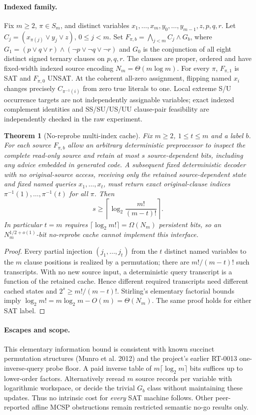 \documentclass[11pt]{article}
\newtheorem{theorem}{Theorem}
\begin{document}
\paragraph{Indexed family.} Fix $m\ge2$, $\pi\in S_m$, and distinct variables $x_1,\ldots,x_m,y_0,\ldots,y_{m-1},z,p,q,r$. Let $C_j=(x_{\pi(j)}\vee y_j\vee z)$, $0\le j<m$. Set $F_{\pi,b}=\bigwedge_{j<m} C_j\land G_b$, where $G_1=(p\vee q\vee r)\land(\neg p\vee\neg q\vee\neg r)$ and $G_0$ is the conjunction of all eight distinct signed ternary clauses on $p,q,r$. The clauses are proper, ordered and have fixed-width indexed source encoding $N_m=\Theta(m\log m)$. For every $\pi$, $F_{\pi,1}$ is SAT and $F_{\pi,0}$ UNSAT. At the coherent all-zero assignment, flipping named $x_i$ changes precisely $C_{\pi^{-1}(i)}$ from zero true literals to one. Local extreme S/U occurrence targets are not independently assignable variables; exact indexed complement identities and SS/SU/US/UU clause-pair feasibility are independently checked in the raw experiment.
\begin{theorem}[No-reprobe multi-index cache]
Fix $m\ge2$, $1\le t\le m$ and a label $b$. For each source $F_{\pi,b}$ allow an arbitrary deterministic preprocessor to inspect the complete read-only source and retain at most $s$ source-dependent bits, including any advice embedded in generated code. A subsequent fixed deterministic decoder with no original-source access, receiving only the retained source-dependent state and fixed named queries $x_1,\ldots,x_t$, must return exact original-clause indices $\pi^{-1}(1),\ldots,\pi^{-1}(t)$ for all $\pi$. Then
\[
\boxed{s\ge\left\lceil\log_2\frac{m!}{(m-t)!}\right\rceil.}
\]
In particular $t=m$ requires $\lceil\log_2m!\rceil=\Omega(N_m)$ persistent bits, so an $N_m^{1/2+o(1)}$-bit no-reprobe cache cannot implement this interface.
\end{theorem}
\begin{proof}
Every partial injection $(j_1,\ldots,j_t)$ from the $t$ distinct named variables to the $m$ clause positions is realized by a permutation; there are $m!/(m-t)!$ such transcripts. With no new source input, a deterministic query transcript is a function of the retained cache. Hence different required transcripts need different cached states and $2^s\ge m!/(m-t)!$. Stirling's elementary factorial bounds imply $\log_2m!=m\log_2m-O(m)=\Theta(N_m)$. The same proof holds for either SAT label.
\end{proof}
\paragraph{Escapes and scope.} This elementary information bound is consistent with known succinct permutation structures (Munro et al. 2012) and the project's earlier RT-0013 one-inverse-query probe floor. A paid inverse table of $m\lceil\log_2m\rceil$ bits suffices up to lower-order factors. Alternatively reread $m$ source records per variable with logarithmic workspace, or decide the trivial $G_b$ class without maintaining these updates. Thus no intrinsic cost for \emph{every} SAT machine follows. Other peer-reported affine MCSP obstructions remain restricted semantic no-go results only.
\end{document}

